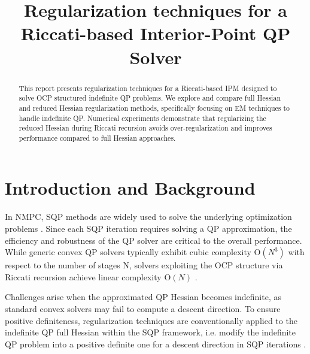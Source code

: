 \documentclass[conference]{IEEEtran}
\begin{document}
\title{Regularization techniques for a Riccati-based Interior-Point QP Solver}

\author{
    \and
    \and
    \and
}
\maketitle

\begin{abstract}
This report presents regularization techniques for a Riccati-based \ac{IPM} designed to solve \ac{OCP} structured indefinite \ac{QP} problems.
We explore and compare full Hessian and reduced Hessian regularization methods, specifically focusing on \ac{EM} techniques to handle indefinite \ac{QP}.
Numerical experiments demonstrate that regularizing the reduced Hessian during Riccati recursion avoids over-regularization and improves performance compared to full Hessian approaches.
\end{abstract}

\acresetall

\section{Introduction and Background}
In \ac{NMPC}, \ac{SQP} methods are widely used to solve the underlying optimization problems \cite{verschueren2020acadosmodularopensourceframework}. 
Since each \ac{SQP} iteration requires solving a \ac{QP} approximation, the efficiency and robustness of the \ac{QP} solver are critical to the overall performance. 
While generic convex \ac{QP} solvers \cite{osqp,Ferreau2014,arnstrom2022dual} typically exhibit cubic complexity $\mathrm{O}(N^3)$ with respect to the number of stages N, 
solvers exploiting the \ac{OCP} structure via Riccati recursion achieve linear complexity $\mathrm{O}(N)$ \cite{gianluca2013efficient}.

Challenges arise when the approximated \ac{QP} Hessian becomes indefinite, 
as standard convex solvers may fail to compute a descent direction. 
To ensure positive definiteness, regularization techniques are conventionally applied to the indefinite QP full Hessian within the SQP framework, 
i.e. modify the indefinite QP problem into a positive definite one for a descent direction in SQP iterations \cite{verschueren2017sparsity}.
\end{document}
